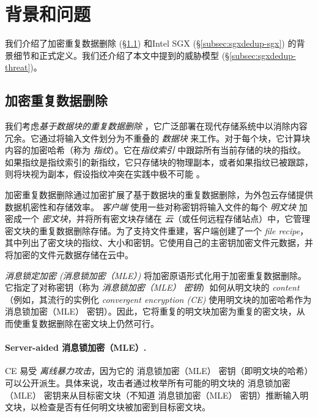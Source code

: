 \section{背景和问题}
\label{sec:sgxdedup-background}

我们介绍了加密重复数据删除 (\S\ref{subsec:sgxdedup-encrypted-dedup}) 和Intel SGX (\S\ref{subsec:sgxdedup-sgx}) 的背景细节和正式定义。我们还介绍了本文中提到的威胁模型 (\S\ref{subsec:sgxdedup-threat})。

\subsection{加密重复数据删除}
\label{subsec:sgxdedup-encrypted-dedup}

{\bf } 我们考虑\textit{基于数据块的重复数据删除} \cite{zhu08,wallace12,meyer11}，它广泛部署在现代存储系统中以消除内容冗余。它通过将输入文件划分为不重叠的 \textit{数据块} 来工作。对于每个块，它计算块内容的加密哈希（称为 \textit{指纹}）。它在\textit{指纹索引} 中跟踪所有当前存储的块的指纹。如果指纹是指纹索引的新指纹，它只存储块的物理副本，或者如果指纹已被跟踪，则将块视为副本，假设指纹冲突在实践中极不可能 \cite{black06}。
   
加密重复数据删除通过加密扩展了基于数据块的重复数据删除，为外包云存储提供数据机密性和存储效率。 \textit{ 客户端} 使用一些对称密钥将输入文件的每个 \textit{ 明文块} 加密成一个 \textit{ 密文块}，并将所有密文块存储在 \textit{ 云}（或任何远程存储站点）中，它管理密文块的重复数据删除存储。为了支持文件重建，客户端创建了一个 \textit{ file recipe}，其中列出了密文块的指纹、大小和密钥。它使用自己的主密钥加密文件元数据，并将加密的文件元数据存储在云中。

\textit{ 消息锁定加密 (消息锁加密（MLE）)} \cite{bellare13a} 将加密原语形式化用于加密重复数据删除。它指定了对称密钥（称为 \textit{ 消息锁加密（MLE） 密钥}）如何从明文块的 \textit{ content}（例如，其流行的实例化 \textit{ convergent encryption (CE)} \cite{douceur02}使用明文块的加密哈希作为 消息锁加密（MLE） 密钥）。因此，它将重复的明文块加密为重复的密文块，从而使重复数据删除在密文块上仍然可行。

\paragraph*{Server-aided 消息锁加密（MLE）.} CE 易受 \textit{ 离线暴力攻击}，因为它的 消息锁加密（MLE） 密钥（即明文块的哈希）可以公开派生。具体来说，攻击者通过枚举所有可能的明文块的 消息锁加密（MLE） 密钥来从目标密文块（不知道 消息锁加密（MLE） 密钥）推断输入明文块，以检查是否有任何明文块被加密到目标密文块。

